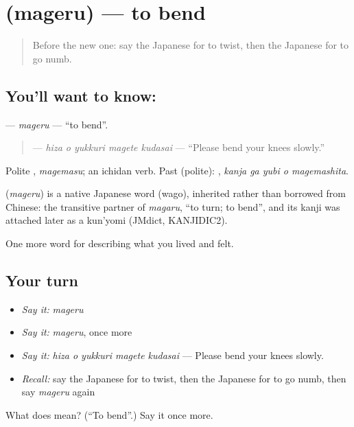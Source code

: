 \section[\texorpdfstring{\ja{まげる} (mageru)}{まげる (mageru)}]{ (mageru) — to bend}

\label{lesson:JA-C448-mageru}



\begin{quote}
Before the new one: say the Japanese for to twist, then the Japanese for to go numb.
\end{quote}

\subsection*{You'll want to know: }
\textbf{} — \emph{mageru} — \textquotedblleft{}to bend\textquotedblright{}.

\begin{quote}
\textbf{   } — \emph{hiza o yukkuri magete kudasai} — \textquotedblleft{}Please bend your knees slowly.\textquotedblright{}
\end{quote}

Polite \textbf{}, \emph{magemasu}; an ichidan verb. Past (polite): \textbf{  }, \emph{kanja ga yubi o magemashita}.

\begin{cousinweb}
\textbf{} (\emph{mageru}) is a native Japanese word (wago), inherited rather than borrowed from Chinese: the transitive partner of \emph{magaru}, \textquotedblleft{}to turn; to bend\textquotedblright{}, and its kanji was attached later as a kun'yomi (JMdict, KANJIDIC2).
\end{cousinweb}

\begin{grammarlens}[title={What you've built}]
One more word for describing what you lived and felt.
\end{grammarlens}

\subsection*{Your turn}
\begin{itemize}
\raggedright
  \item \emph{Say it:} \emph{mageru}
  \item \emph{Say it:} \emph{mageru}, once more
  \item \emph{Say it:} \emph{hiza o yukkuri magete kudasai} — Please bend your knees slowly.
  \item \emph{Recall:} say the Japanese for to twist, then the Japanese for to go numb, then say \emph{mageru} again
\end{itemize}

\begin{tcolorbox}[breakable,colback=teal!4,colframe=teal!35!black,title={Before you move on}]
What does  mean? (\textquotedblleft{}To bend\textquotedblright{}.) Say it once more.
\end{tcolorbox}
